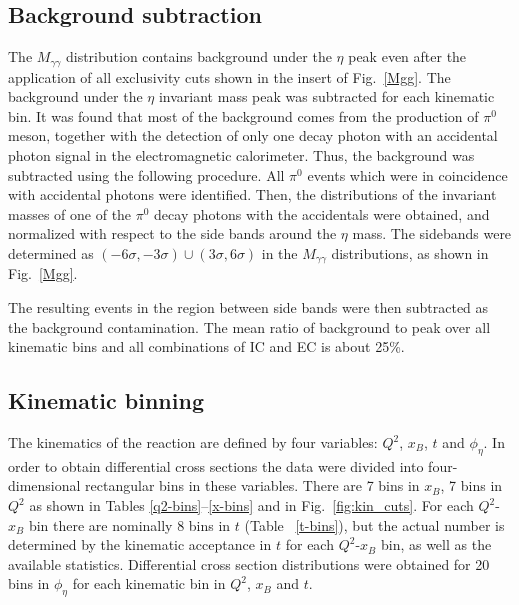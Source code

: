 \documentclass[prc,aps,floatfix,showpacs,showkeys,twocolumn,superscriptaddress,letterpaper,10pt]{revtex4-1}
\begin{document}
\subsection{Background subtraction}

The $M_{\gamma\gamma}$ distribution contains  background under the $\eta$ peak even after the application of all exclusivity cuts shown in the insert of Fig.~\ref{Mgg}.
The background under the $\eta$ invariant mass peak was subtracted for each kinematic bin.
It was found that most of the  background  comes from  
the production of  $\pi^0$ meson, together  with the detection of only one decay photon 
 with an accidental photon signal in the electromagnetic calorimeter.
Thus, the background was subtracted using  the following procedure. All $\pi^0$ events which were in coincidence with  accidental photons were identified.  Then, the distributions of the invariant masses of one of the  $\pi^0$ decay photons with the accidentals  were obtained, and normalized with respect to the side bands around the $\eta$ mass. The sidebands  were determined as $(-6\sigma,-3\sigma) \cup  (3\sigma,6\sigma)$ in the $M_{\gamma\gamma}$ distributions, as shown in Fig.~\ref{Mgg}.
 
The   resulting events in the region between side bands were then subtracted as the background contamination.   The mean ratio of   background to peak over all kinematic bins and all  combinations of IC and EC is about 25\%.






 \subsection{Kinematic binning}
 
 The kinematics of the reaction  are defined by four variables: $Q^2$, $x_B$,  $t$ and $\phi_{\eta}$.
In order to obtain differential cross sections the data were divided into four-dimensional rectangular bins in these variables.
There are 7 bins in $x_B$, 7 bins in $Q^2$ as shown 
in Tables \ref{q2-bins}--\ref{x-bins} and 
in Fig.~\ref{fig:kin_cuts}. For each $Q^2$-$x_B$ bin there are nominally 8 bins in $t$
(Table ~\ref{t-bins}),
but the actual number  is determined by the  kinematic acceptance in $t$ 
for each $Q^2$-$x_B$ bin, as well as the available statistics. Differential cross section distributions were obtained for 20 bins in $\phi_\eta$ for each kinematic bin in  $Q^2$, $x_B$ and $t$.  
\end{document}
